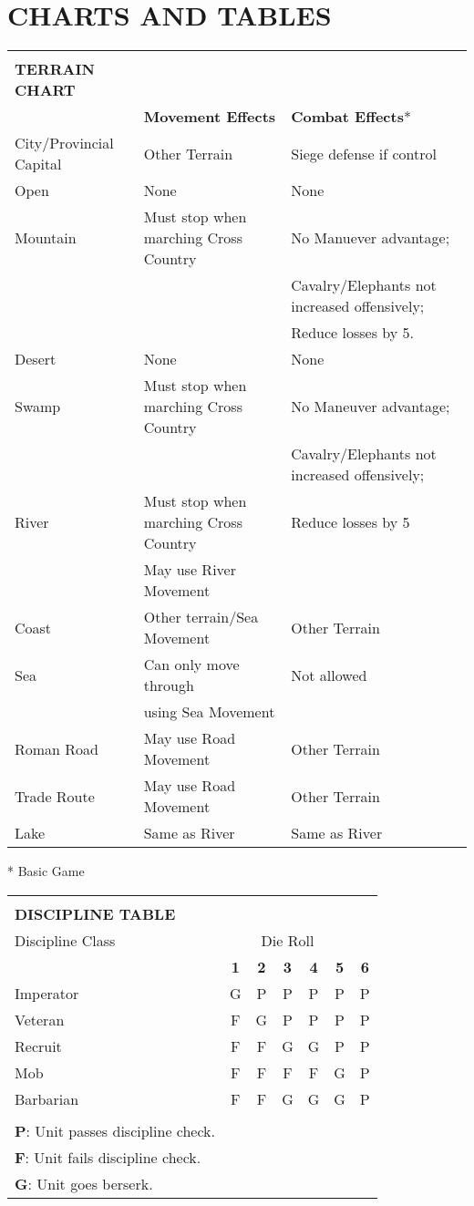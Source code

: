 \clearpage
\section{CHARTS AND TABLES}

\begin{tabular}{|lll|}
  \hline & &\\[-2.0ex]
  \textbf{TERRAIN CHART} & &\\
  & \textbf{Movement Effects} & \textbf{Combat Effects}*\\
  City/Provincial Capital & Other Terrain & Siege defense if control\\
  Open & None & None\\
  Mountain & Must stop when marching Cross Country & No Manuever advantage;\\
  & & Cavalry/Elephants not increased offensively;\\
  & & Reduce losses by 5.\\
  Desert & None & None\\
  Swamp & Must stop when marching Cross Country & No Maneuver advantage;\\
  & & Cavalry/Elephants not increased offensively;\\
  River & Must stop when marching Cross Country & Reduce losses by 5\\
  & May use River Movement &\\
  Coast & Other terrain/Sea Movement & Other Terrain\\
  Sea & Can only move through & Not allowed\\
  & using Sea Movement &\\
  Roman Road & May use Road Movement & Other Terrain\\
  Trade Route & May use Road Movement & Other Terrain\\
  Lake & Same as River & Same as River\\
  \hline
\end{tabular}

* Basic Game

\bigskip

\begin{tabular}{|lcccccc|}
  \hline & & & & & &\\[-2.0ex]
  \textbf{DISCIPLINE TABLE} & & & & & &\\
  Discipline Class & \multicolumn{5}{c}{Die Roll} &\\
  & \textbf{1} & \textbf{2} & \textbf{3} & \textbf{4} & \textbf{5} & \textbf{6}\\
  Imperator & G & P & P & P & P & P\\
  Veteran & F & G & P & P & P & P\\
  Recruit & F & F & G & G & P & P\\
  Mob & F & F & F & F & G & P\\
  Barbarian & F & F & G & G & G & P\\
  & & & & & &\\
  \textbf{P}: Unit passes discipline check. & & & & & &\\
  \textbf{F}: Unit fails discipline check. & & & & & &\\
  \textbf{G}: Unit goes berserk. & & & & & &\\
  \hline
\end{tabular}
